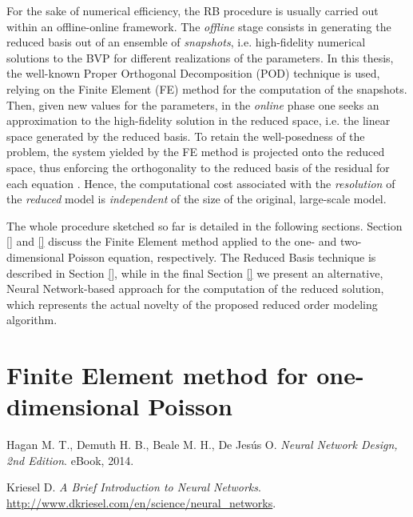 \documentclass[11pt, a4paper, twoside, openright]{report}
\theoremstyle{theorem}
\numberwithin{equation}{section}
\numberwithin{figure}{section}
\begin{document}
		For the sake of numerical efficiency, the RB procedure is usually carried out within an offline-online framework. The \emph{offline} stage consists in generating the reduced basis out of an ensemble of \emph{snapshots}, i.e. high-fidelity numerical solutions to the BVP for different realizations of the parameters. In this thesis, the well-known Proper Orthogonal Decomposition (POD) technique is used, relying on the Finite Element (FE) method for the computation of the snapshots. Then, given new values for the parameters, in the \emph{online} phase one seeks an approximation to the high-fidelity solution in the reduced space, i.e. the linear space generated by the reduced basis. To retain the well-posedness of the problem, the system yielded by the FE method is projected onto the reduced space, thus enforcing the orthogonality to the reduced basis of the residual for each equation \cite{HRS15,MN16}. Hence, the computational cost associated with the \emph{resolution} of the \emph{reduced} model is \emph{independent} of the size of the original, large-scale model. 
		
		The whole procedure sketched so far is detailed in the following sections. Section \ref{} and \ref{} discuss the Finite Element method applied to the one- and two-dimensional Poisson equation, respectively. The Reduced Basis technique is described in Section \ref{}, while in the final Section \ref{} we present an alternative, Neural Network-based approach for the computation of the reduced solution, which represents the actual novelty of the proposed reduced order modeling algorithm.
		
	\section{Finite Element method for one-dimensional Poisson}
	\label{section:Finite Element method for one-dimensional Poisson}
		
		
	\begin{thebibliography}{50}
	
		Hagan M. T., Demuth H. B., Beale M. H., De Jes\'us O. \emph{Neural Network Design, 2nd Edition}. eBook, 2014.
		
		Kriesel D. \emph{A Brief Introduction to Neural Networks}. \url{http://www.dkriesel.com/en/science/neural_networks}.
		
	\end{thebibliography}	
	
\end{document}
